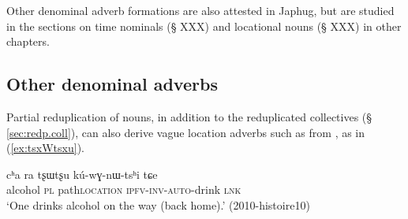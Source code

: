 Other denominal adverb formations are also attested in Japhug, but are studied in the sections on time nominals (§ XXX) and locational nouns (§  XXX) in other chapters.


\subsection{Other denominal adverbs} \label{sec:other.denominal.adverbs}
Partial reduplication of nouns, in addition to the reduplicated collectives (§ \ref{sec:redp.coll}), can also derive vague location adverbs such as  from , as in (\ref{ex:tsxWtsxu}).

\begin{exe}
\ex \label{ex:tsxWtsxu}
\gll cʰa ra tʂɯ\redp{}tʂu kú-wɣ-nɯ-tsʰi tɕe \\
alcohol \textsc{pl} path\redp{}\textsc{location}  \textsc{ipfv}-\textsc{inv}-\textsc{auto}-drink \textsc{lnk} \\
\glt `One drinks alcohol on the way (back home).' (2010-histoire10)
\end{exe}
